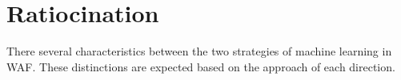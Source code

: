 

\section{Ratiocination}
\label{ratio}
\hspace{0.5cm}There several characteristics between the two strategies of machine learning in WAF. These distinctions are expected based on the approach of each direction.


